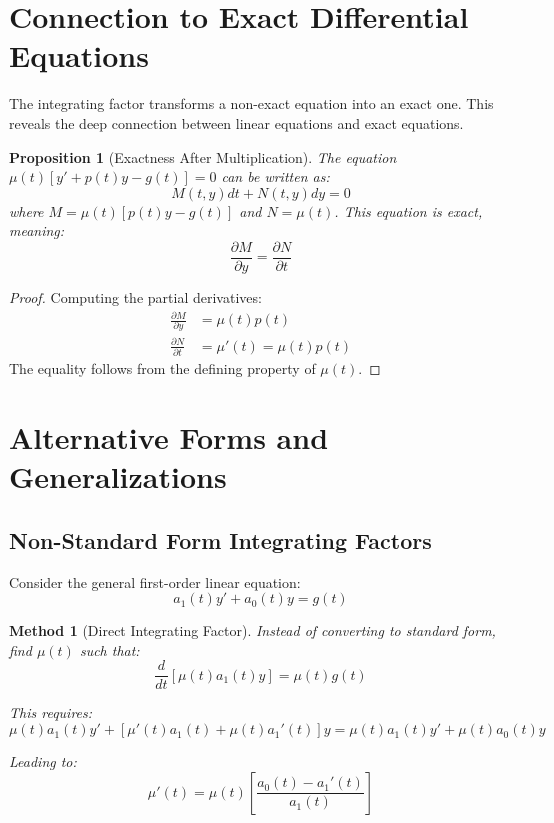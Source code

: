 \documentclass[12pt]{article}
\newtheorem{proposition}{Proposition}
\newtheorem{method}{Method}
\begin{document}
\section{Connection to Exact Differential Equations}

\begin{insight}
The integrating factor transforms a non-exact equation into an exact one. This reveals the deep connection between linear equations and exact equations.
\end{insight}

\begin{proposition}[Exactness After Multiplication]
The equation $\mu(t)[y' + p(t)y - g(t)] = 0$ can be written as:
\begin{equation}
M(t,y)dt + N(t,y)dy = 0
\end{equation}
where $M = \mu(t)[p(t)y - g(t)]$ and $N = \mu(t)$. This equation is exact, meaning:
\begin{equation}
\frac{\partial M}{\partial y} = \frac{\partial N}{\partial t}
\end{equation}
\end{proposition}

\begin{proof}
Computing the partial derivatives:
\begin{align}
\frac{\partial M}{\partial y} &= \mu(t)p(t) \\
\frac{\partial N}{\partial t} &= \mu'(t) = \mu(t)p(t)
\end{align}
The equality follows from the defining property of $\mu(t)$.
\end{proof}

\section{Alternative Forms and Generalizations}

\subsection{Non-Standard Form Integrating Factors}

Consider the general first-order linear equation:
\begin{equation}
a_1(t)y' + a_0(t)y = g(t)
\end{equation}

\begin{method}[Direct Integrating Factor]
Instead of converting to standard form, find $\mu(t)$ such that:
\begin{equation}
\frac{d}{dt}[\mu(t)a_1(t)y] = \mu(t)g(t)
\end{equation}

This requires:
\begin{equation}
\mu(t)a_1(t)y' + [\mu'(t)a_1(t) + \mu(t)a_1'(t)]y = \mu(t)a_1(t)y' + \mu(t)a_0(t)y
\end{equation}

Leading to:
\begin{equation}
\mu'(t) = \mu(t)\left[\frac{a_0(t) - a_1'(t)}{a_1(t)}\right]
\end{equation}
\end{method}
\end{document}
